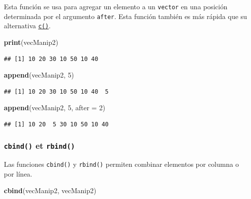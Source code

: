 \documentclass[]{book}
\newenvironment{Shaded}{\begin{snugshade}}{\end{snugshade}}
\newcommand{\KeywordTok}[1]{\textcolor[rgb]{0.13,0.29,0.53}{\textbf{#1}}}
\newcommand{\DataTypeTok}[1]{\textcolor[rgb]{0.13,0.29,0.53}{#1}}
\newcommand{\DecValTok}[1]{\textcolor[rgb]{0.00,0.00,0.81}{#1}}
\newcommand{\NormalTok}[1]{#1}
\begin{document}
Esta función se usa para agregar un elemento a un \texttt{vector} en una
posición determinada por el argumento \texttt{after}. Esta función
también es más rápida que su alternativa
\protect\hyperlink{l014vector}{\texttt{c()}}.

\begin{Shaded}
\begin{Highlighting}[]
\KeywordTok{print}\NormalTok{(vecManip2)}
\end{Highlighting}
\end{Shaded}

\begin{verbatim}
## [1] 10 20 30 10 50 10 40
\end{verbatim}

\begin{Shaded}
\begin{Highlighting}[]
\KeywordTok{append}\NormalTok{(vecManip2, }\DecValTok{5}\NormalTok{)}
\end{Highlighting}
\end{Shaded}

\begin{verbatim}
## [1] 10 20 30 10 50 10 40  5
\end{verbatim}

\begin{Shaded}
\begin{Highlighting}[]
\KeywordTok{append}\NormalTok{(vecManip2, }\DecValTok{5}\NormalTok{, }\DataTypeTok{after =} \DecValTok{2}\NormalTok{)}
\end{Highlighting}
\end{Shaded}

\begin{verbatim}
## [1] 10 20  5 30 10 50 10 40
\end{verbatim}

\subsubsection{\texorpdfstring{\texttt{cbind()} et
\texttt{rbind()}}{cbind() et rbind()}}\label{l015cbind}

Las funciones \texttt{cbind()} y \texttt{rbind()} permiten combinar
elementos por columna o por línea.

\begin{Shaded}
\begin{Highlighting}[]
\KeywordTok{cbind}\NormalTok{(vecManip2, vecManip2)}
\end{Highlighting}
\end{Shaded}
\end{document}
